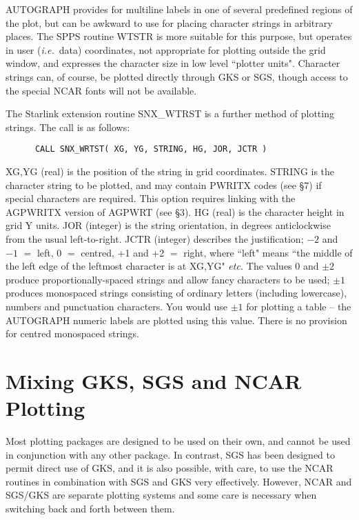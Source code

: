 AUTOGRAPH provides for multiline labels in one of several
predefined regions of the plot, but can be awkward to use for
placing character strings in arbitrary places.
The SPPS routine WTSTR is more suitable for this purpose, but
operates in user ({\em i.e.}\ data) coordinates, not appropriate for
plotting outside the grid window, and expresses the character
size in low level ``plotter units".
Character strings can, of course, be plotted directly
through GKS or SGS, though access to the special NCAR fonts
will not be available.

The Starlink extension routine SNX\_WTRST is a further method
of plotting strings.
The call is as follows:

\begin{verbatim}
      CALL SNX_WRTST( XG, YG, STRING, HG, JOR, JCTR )
\end{verbatim}

XG,YG (real) is the position of the string in grid coordinates.
STRING is the character string to be plotted, and may contain PWRITX codes
(see \S 7) if special characters are required.
This option requires linking with the AGPWRITX
version of AGPWRT (see \S 3).
HG (real) is the character height in grid Y units.
JOR (integer) is the string orientation, in degrees anticlockwise from
the usual left-to-right.
JCTR (integer) describes the justification; $-2$ and $-1$ $=$ left,
0 $=$ centred, +1 and +2 $=$ right, where ``left" means ``the middle of
the left edge of the leftmost character is at XG,YG" {\em etc.}
The values 0 and $\pm2$ produce proportionally-spaced strings and
allow fancy characters to be used;
$\pm1$ produces monospaced strings consisting of ordinary letters
(including lowercase), numbers and punctuation characters.
You would use $\pm1$ for plotting a table -- 
the AUTOGRAPH numeric labels are plotted using this value.
There is no provision for centred monospaced strings.


\section {Mixing GKS, SGS and NCAR Plotting}

Most plotting packages are designed to be used on their own,
and cannot be used in conjunction with any other package.
In contrast, SGS has been designed to permit direct use of
GKS, and it is also possible, with care, to use the NCAR routines
in combination with SGS and GKS very effectively.
However, NCAR and SGS/GKS are separate plotting systems and some
care is necessary when switching back and forth between them.


